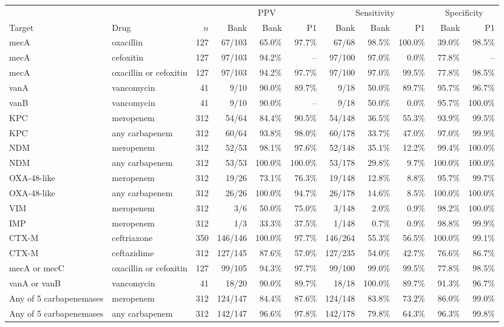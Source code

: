 \begin{tabular}{@{}llrrrrrrrrr@{}}
\toprule
 & & & \multicolumn{3}{c}{PPV} & \multicolumn{3}{c}{Sensitivity} & \multicolumn{2}{c}{Specificity} \\
\cmidrule(lr){4-6}\cmidrule(lr){7-9}\cmidrule(l){10-11}
Target & Drug & $n$ & Bank & Bank & P1 & Bank & Bank & P1 & Bank & P1 \\
\midrule
mecA & oxacillin & 127 & 67/103 & 65.0\% & 97.7\% & 67/68 & 98.5\% & 100.0\% & 39.0\% & 98.5\% \\
mecA & cefoxitin & 127 & 97/103 & 94.2\% & -- & 97/100 & 97.0\% & 0.0\% & 77.8\% & -- \\
mecA & oxacillin or cefoxitin & 127 & 97/103 & 94.2\% & 97.7\% & 97/100 & 97.0\% & 99.5\% & 77.8\% & 98.5\% \\
vanA & vancomycin & 41 & 9/10 & 90.0\% & 89.7\% & 9/18 & 50.0\% & 89.7\% & 95.7\% & 96.7\% \\
vanB & vancomycin & 41 & 9/10 & 90.0\% & -- & 9/18 & 50.0\% & 0.0\% & 95.7\% & 100.0\% \\
KPC & meropenem & 312 & 54/64 & 84.4\% & 90.5\% & 54/148 & 36.5\% & 55.3\% & 93.9\% & 99.5\% \\
KPC & any carbapenem & 312 & 60/64 & 93.8\% & 98.0\% & 60/178 & 33.7\% & 47.0\% & 97.0\% & 99.9\% \\
NDM & meropenem & 312 & 52/53 & 98.1\% & 97.6\% & 52/148 & 35.1\% & 12.2\% & 99.4\% & 100.0\% \\
NDM & any carbapenem & 312 & 53/53 & 100.0\% & 100.0\% & 53/178 & 29.8\% & 9.7\% & 100.0\% & 100.0\% \\
OXA-48-like & meropenem & 312 & 19/26 & 73.1\% & 76.3\% & 19/148 & 12.8\% & 8.8\% & 95.7\% & 99.7\% \\
OXA-48-like & any carbapenem & 312 & 26/26 & 100.0\% & 94.7\% & 26/178 & 14.6\% & 8.5\% & 100.0\% & 100.0\% \\
VIM & meropenem & 312 & 3/6 & 50.0\% & 75.0\% & 3/148 & 2.0\% & 0.9\% & 98.2\% & 100.0\% \\
IMP & meropenem & 312 & 1/3 & 33.3\% & 37.5\% & 1/148 & 0.7\% & 0.9\% & 98.8\% & 99.9\% \\
CTX-M & ceftriaxone & 350 & 146/146 & 100.0\% & 97.7\% & 146/264 & 55.3\% & 56.5\% & 100.0\% & 99.1\% \\
CTX-M & ceftazidime & 312 & 127/145 & 87.6\% & 57.0\% & 127/235 & 54.0\% & 42.7\% & 76.6\% & 86.7\% \\
\midrule
mecA or mecC & oxacillin or cefoxitin & 127 & 99/105 & 94.3\% & 97.7\% & 99/100 & 99.0\% & 99.5\% & 77.8\% & 98.5\% \\
vanA or vanB & vancomycin & 41 & 18/20 & 90.0\% & 89.7\% & 18/18 & 100.0\% & 89.7\% & 91.3\% & 96.7\% \\
Any of 5 carbapenemases & meropenem & 312 & 124/147 & 84.4\% & 87.6\% & 124/148 & 83.8\% & 73.2\% & 86.0\% & 99.0\% \\
Any of 5 carbapenemases & any carbapenem & 312 & 142/147 & 96.6\% & 97.8\% & 142/178 & 79.8\% & 64.3\% & 96.3\% & 99.8\% \\
\bottomrule
\end{tabular}
